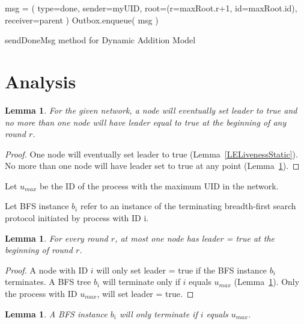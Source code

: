 \documentclass[english]{article}
\newtheorem{lemma}[theorem]{Lemma}
\begin{document}
\begin{algorithm}
  msg = ( type=done, sender=myUID, root=(r=maxRoot.r+1, id=maxRoot.id), receiver=parent ) \;
  Outbox.enqueue( msg ) \;
  \caption{sendDoneMsg method for Dynamic Addition Model}
\end{algorithm}

\section{Analysis}



\begin{lemma}
\label{LeaderElectionStatic}
For the given network, a node will eventually set leader to true and no more than one node will have leader equal to true at the beginning of any round $r$. 
\end{lemma}
\begin{proof}
One node will eventually set leader to true (Lemma~\ref{LELivenessStatic}).
No more than one node will have leader set to true at any point (Lemma~\ref{LESafetyStatic}).
\end{proof}

\begin{definition}
Let $u_{max}$ be the ID of the process with the maximum UID in the network. 
\end{definition}

\begin{definition}
Let BFS instance $b_i$ refer to an instance of the terminating breadth-first search protocol initiated by process with ID i.
\end{definition}

\begin{lemma}
\label{LESafetyStatic}
For every round $r$, at most one node has leader = true at the beginning of round $r$.
\end{lemma}
\begin{proof}

A node with ID $i$ will only set leader = true if the BFS instance $b_i$ terminates.
A BFS tree $b_i$ will terminate only if $i$ equals $u_{max}$ (Lemma~\ref{BFSTermination}).
Only the process with ID $u_{max}$, will set leader = true. 

\end{proof}

\begin{lemma}
\label{BFSTermination}
  A BFS instance $b_i$ will only terminate if $i$ equals $u_{max}$.
\end{lemma}
\end{document}
